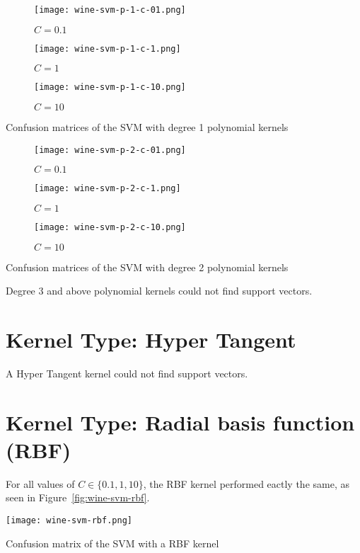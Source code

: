 \documentclass[
  coursecode={CMPE 251},
  assignmentname={Exercise \exercisenumber},
  studentnumber=20053722,
  name={Bryan Hoang},
  draft,
]{
  ltxanswer%
}
\begin{document}
\begin{questions}
\begin{solution}
      \begin{answerfigure}
        \begin{subfigure}{0.49\textwidth}
          \texttt{[image: wine-svm-p-1-c-01.png]}
          \caption{\(C=0.1\)}
        \end{subfigure}
        \begin{subfigure}{0.49\textwidth}
          \texttt{[image: wine-svm-p-1-c-1.png]}
          \caption{\(C=1\)}
        \end{subfigure}
        \par\bigskip
        \begin{subfigure}{0.49\textwidth}
          \texttt{[image: wine-svm-p-1-c-10.png]}
          \caption{\(C=10\)}
        \end{subfigure}
        \caption{Confusion matrices of the SVM with degree 1 polynomial kernels}
        \label{fig:wine-svm-p-1}
      \end{answerfigure}
      \begin{answerfigure}
        \begin{subfigure}{0.49\textwidth}
          \texttt{[image: wine-svm-p-2-c-01.png]}
          \caption{\(C=0.1\)}
        \end{subfigure}
        \begin{subfigure}{0.49\textwidth}
          \texttt{[image: wine-svm-p-2-c-1.png]}
          \caption{\(C=1\)}
        \end{subfigure}
        \par\bigskip
        \begin{subfigure}{0.49\textwidth}
          \texttt{[image: wine-svm-p-2-c-10.png]}
          \caption{\(C=10\)}
        \end{subfigure}
        \caption{Confusion matrices of the SVM with degree 2 polynomial kernels}
        \label{fig:wine-svm-p-2}
      \end{answerfigure}
      Degree 3 and above polynomial kernels could not find support vectors.

      \section*{Kernel Type: Hyper Tangent}
      A Hyper Tangent kernel could not find support vectors.

      \section*{Kernel Type: Radial basis function (RBF)}
      For all values of \(C\in\{0.1,1,10\}\), the RBF kernel performed eactly the same, as seen in Figure~\ref{fig:wine-svm-rbf}.
      \begin{answerfigure}
        \texttt{[image: wine-svm-rbf.png]}
        \caption{Confusion matrix of the SVM with a RBF kernel}
        \label{fig:wine-svm-rbf}
      \end{answerfigure}


\end{solution}
\end{questions}
\end{document}
